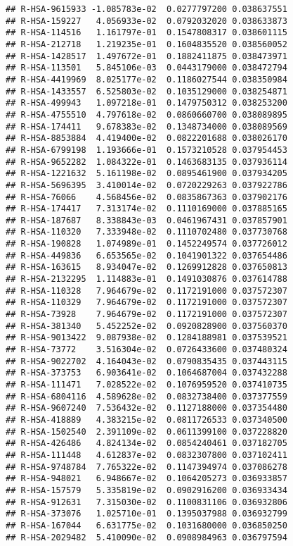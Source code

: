 \documentclass[
]{article}
\begin{document}
\begin{verbatim}
## R-HSA-9615933 -1.085783e-02  0.0277797200 0.038637551
## R-HSA-159227   4.056933e-02  0.0792032020 0.038633873
## R-HSA-114516   1.161797e-01  0.1547808317 0.038601115
## R-HSA-212718   1.219235e-01  0.1604835520 0.038560052
## R-HSA-1428517  1.497672e-01  0.1882411875 0.038473971
## R-HSA-113501   5.845106e-03  0.0443179000 0.038472794
## R-HSA-4419969  8.025177e-02  0.1186027544 0.038350984
## R-HSA-1433557  6.525803e-02  0.1035129000 0.038254871
## R-HSA-499943   1.097218e-01  0.1479750312 0.038253200
## R-HSA-4755510  4.797618e-02  0.0860660700 0.038089895
## R-HSA-174411   9.678383e-02  0.1348734000 0.038089569
## R-HSA-8853884  4.419400e-02  0.0822201688 0.038026170
## R-HSA-6799198  1.193666e-01  0.1573210528 0.037954453
## R-HSA-9652282  1.084322e-01  0.1463683135 0.037936114
## R-HSA-1221632  5.161198e-02  0.0895461900 0.037934205
## R-HSA-5696395  3.410014e-02  0.0720229263 0.037922786
## R-HSA-76066    4.568456e-02  0.0835867363 0.037902176
## R-HSA-174417   7.313174e-02  0.1110169000 0.037885165
## R-HSA-187687   8.338843e-03  0.0461967431 0.037857901
## R-HSA-110320   7.333948e-02  0.1110702480 0.037730768
## R-HSA-190828   1.074989e-01  0.1452249574 0.037726012
## R-HSA-449836   6.653565e-02  0.1041901322 0.037654486
## R-HSA-163615   8.934047e-02  0.1269912828 0.037650813
## R-HSA-2132295  1.114883e-01  0.1491030876 0.037614788
## R-HSA-110328   7.964679e-02  0.1172191000 0.037572307
## R-HSA-110329   7.964679e-02  0.1172191000 0.037572307
## R-HSA-73928    7.964679e-02  0.1172191000 0.037572307
## R-HSA-381340   5.452252e-02  0.0920828900 0.037560370
## R-HSA-9013422  9.087938e-02  0.1284188981 0.037539521
## R-HSA-73772    3.516304e-02  0.0726433600 0.037480324
## R-HSA-9022702  4.164043e-02  0.0790835435 0.037443115
## R-HSA-373753   6.903641e-02  0.1064687004 0.037432288
## R-HSA-111471   7.028522e-02  0.1076959520 0.037410735
## R-HSA-6804116  4.589628e-02  0.0832738400 0.037377559
## R-HSA-9607240  7.536432e-02  0.1127188000 0.037354480
## R-HSA-418889   4.383215e-02  0.0811726533 0.037340500
## R-HSA-1502540  2.391109e-02  0.0611399100 0.037228820
## R-HSA-426486   4.824134e-02  0.0854240461 0.037182705
## R-HSA-111448   4.612837e-02  0.0832307800 0.037102411
## R-HSA-9748784  7.765322e-02  0.1147394974 0.037086278
## R-HSA-948021   6.948667e-02  0.1064205273 0.036933857
## R-HSA-157579   5.335819e-02  0.0902916200 0.036933434
## R-HSA-912631   7.315030e-02  0.1100831106 0.036932806
## R-HSA-373076   1.025710e-01  0.1395037988 0.036932799
## R-HSA-167044   6.631775e-02  0.1031680000 0.036850250
## R-HSA-2029482  5.410090e-02  0.0908984963 0.036797594

\end{verbatim}
\end{document}
